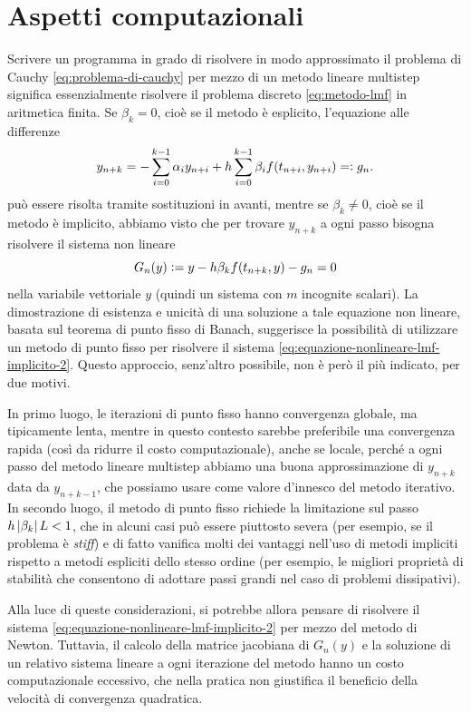 \section{Aspetti computazionali}

Scrivere un programma in grado di risolvere in modo approssimato il problema
di Cauchy \eqref{eq:problema-di-cauchy} per mezzo di un metodo lineare
multistep significa essenzialmente risolvere il problema discreto
\eqref{eq:metodo-lmf} in aritmetica finita.
Se $\beta_k = 0$, cioè se il metodo è esplicito,
l'equazione alle differenze
\[
y_{n+k} = - \sum_{i=0}^{k-1} \alpha_i y_{n+i}
        + h \sum_{i=0}^{k-1} \beta_i f(t_{n+i},y_{n+i})
        =\vcentcolon g_n.
\]
può essere risolta tramite sostituzioni in avanti, mentre se $\beta_k \neq 0$,
cioè se il metodo è implicito, abbiamo visto che per trovare $y_{n+k}$
a ogni passo bisogna risolvere il sistema non lineare
\begin{equation} \label{eq:equazione-nonlineare-lmf-implicito-2}
G_n(y) \vcentcolon= y - h \beta_k f(t_{n+k},y) - g_n = 0
\end{equation}
nella variabile vettoriale $y$ (quindi un sistema con $m$ incognite scalari).
La dimostrazione di esistenza e unicità di una soluzione a tale equazione
non lineare, basata sul teorema di punto fisso di Banach,
suggerisce la possibilità di utilizzare un metodo di punto fisso
per risolvere il sistema \eqref{eq:equazione-nonlineare-lmf-implicito-2}.
Questo approccio, senz'altro possibile, non è però il più indicato, per due motivi.

In primo luogo, le iterazioni di punto fisso hanno convergenza globale, ma
tipicamente lenta, mentre in questo contesto sarebbe preferibile una convergenza
rapida (così da ridurre il costo computazionale), anche se locale, perché
a ogni passo del metodo lineare multistep abbiamo una buona approssimazione
di $y_{n+k}$ data da $y_{n+k-1}$, che possiamo usare come valore d'innesco
del metodo iterativo.
In secondo luogo, il metodo di punto fisso richiede la limitazione sul passo
$h \left\lvert\beta_k\right\rvert L < 1$, che in alcuni casi può essere piuttosto severa
(per esempio, se il problema è \emph{stiff}) e di fatto vanifica molti
dei vantaggi nell'uso di metodi impliciti rispetto a metodi espliciti dello
stesso ordine (per esempio, le migliori proprietà di stabilità che consentono
di adottare passi grandi nel caso di problemi dissipativi).

Alla luce di queste considerazioni, si potrebbe allora pensare di risolvere
il sistema \eqref{eq:equazione-nonlineare-lmf-implicito-2} per mezzo del metodo
di Newton. Tuttavia, il calcolo della matrice jacobiana di $G_n(y)$
e la soluzione di un relativo sistema lineare a ogni iterazione del metodo
hanno un costo computazionale eccessivo, che nella pratica non giustifica
il beneficio della velocità di convergenza quadratica.

